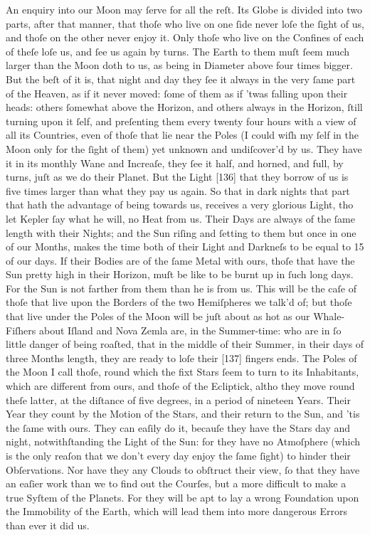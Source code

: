 \documentclass[letterpaper]{book}
\begin{document}
An enquiry into our Moon may ſerve for all the reſt. Its Globe is divided
into two parts, after that manner, that thoſe who live on one ſide never
loſe the ſight of us, and thoſe on the other never enjoy it. Only thoſe who
live on the Confines of each of theſe loſe us, and ſee us again by turns. The
Earth to them muſt ſeem much larger than the Moon doth to us, as being in
Diameter above four times bigger. But the beſt of it is, that night and day
they ſee it always in the very ſame part of the Heaven, as if it never moved:
ſome of them as if 'twas falling upon their heads: others ſomewhat above
the Horizon, and others always in the Horizon, ſtill turning upon it ſelf, and
preſenting them every twenty four hours with a view of all its Countries,
even of thoſe that lie near the Poles (I could wiſh my ſelf in the Moon only
for the ſight of them) yet unknown and undiſcover'd by us. They have it
in its monthly Wane and Increaſe, they ſee it half, and horned, and full, by
turns, juſt as we do their Planet. But the Light [136] that they borrow of us
is five times larger than what they pay us again. So that in dark nights that
part that hath the advantage of being towards us, receives a very glorious
Light, tho let Kepler ſay what he will, no Heat from us. Their Days are
always of the ſame length with their Nights; and the Sun riſing and ſetting
to them but once in one of our Months, makes the time both of their Light
and Darkneſs to be equal to 15 of our days. If their Bodies are of the ſame
Metal with ours, thoſe that have the Sun pretty high in their Horizon, muſt
be like to be burnt up in ſuch long days. For the Sun is not farther from
them than he is from us. This will be the caſe of thoſe that live upon the
Borders of the two Hemiſpheres we talk'd of; but thoſe that live under the
Poles of the Moon will be juſt about as hot as our Whale-Fiſhers about
Iſland and Nova Zemla are, in the Summer-time: who are in ſo little danger
of being roaſted, that in the middle of their Summer, in their days of three
Months length, they are ready to loſe their [137] fingers ends. The Poles
of the Moon I call thoſe, round which the fixt Stars ſeem to turn to its
Inhabitants, which are different from ours, and thoſe of the Ecliptick, altho
they move round theſe latter, at the diſtance of five degrees, in a period
of nineteen Years. Their Year they count by the Motion of the Stars, and
their return to the Sun, and 'tis the ſame with ours. They can eaſily do it,
becauſe they have the Stars day and night, notwithſtanding the Light of the
Sun: for they have no Atmoſphere (which is the only reaſon that we don't
every day enjoy the ſame ſight) to hinder their Obſervations. Nor have
they any Clouds to obſtruct their view, ſo that they have an eaſier work
than we to find out the Courſes, but a more difficult to make a true Syſtem
of the Planets. For they will be apt to lay a wrong Foundation upon the
Immobility of the Earth, which will lead them into more dangerous Errors
than ever it did us.
\end{document}
